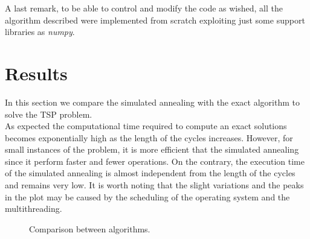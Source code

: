\documentclass{article}
\begin{document}
\noindent A last remark, to be able to control and modify the code as wished, all the algorithm described were implemented from scratch exploiting just some support libraries as \textit{numpy}.

\section{Results}
In this section we compare the simulated annealing with the exact algorithm to solve the TSP problem. \\
As expected the computational time required to compute an exact solutions becomes exponentially high as the length of the cycles increases. However, for small instances of the problem, it is more efficient that the simulated annealing since it perform faster and fewer operations. On the contrary, the execution time of the simulated annealing is almost independent from the length of the cycles and remains very low. It is worth noting that the slight variations and the peaks in the plot may be caused by the scheduling of the operating system and the multithreading.
\begin{figure}[H]
\begin{adjustwidth}{-4em}{-4em}

     \hfill
     
     \caption{Comparison between algorithms.}
    \end{adjustwidth}
   \end{figure}
 
\end{document}
